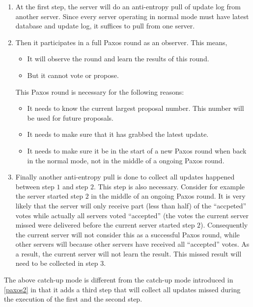 \documentclass[11pt]{article}
\begin{document}
\begin{enumerate}
    \item At the first step, the server will do an anti-entropy pull of update log from another server.
        Since every server operating in normal mode must have latest database and update log, it suffices to pull from one server.
    \item Then it participates in a full Paxos round as an observer.
        This means,
        \begin{itemize}
            \item It will observe the round and learn the results of this round.
            \item But it cannot vote or propose.
        \end{itemize}
        This Paxos round is necessary for the following reasons:
        \begin{itemize}
            \item It needs to know the current largest proposal number.
                This number will be used for future proposals.
            \item It needs to make sure that it has grabbed the latest update.
            \item It needs to make sure it be in the start of a new Paxos round when back in the normal mode, not in the middle of a ongoing Paxos round.
        \end{itemize}
    \item Finally another anti-entropy pull is done to collect all updates happened between step $1$ and step $2$.
        This step is also necessary.
        Consider for example the server started step $2$ in the middle of an ongoing Paxos round.
        It is very likely that the server will only receive part (less than half) of the ``accpeted'' votes while actually all servers voted ``accepted'' (the votes the current server missed were delivered before the current server started step $2$).
        Consequently the current server will not consider this as a successful Paxos round, while other servers will because other servers have received all ``accepted'' votes.
        As a result, the current server will not learn the result.
        This missed result will need to be collected in step $3$.
\end{enumerate}
The above catch-up mode is different from the catch-up mode introduced in \ref{paxos2} in that it adds a third step that will collect all updates missed during the execution of the first and the second step.
\end{document}
